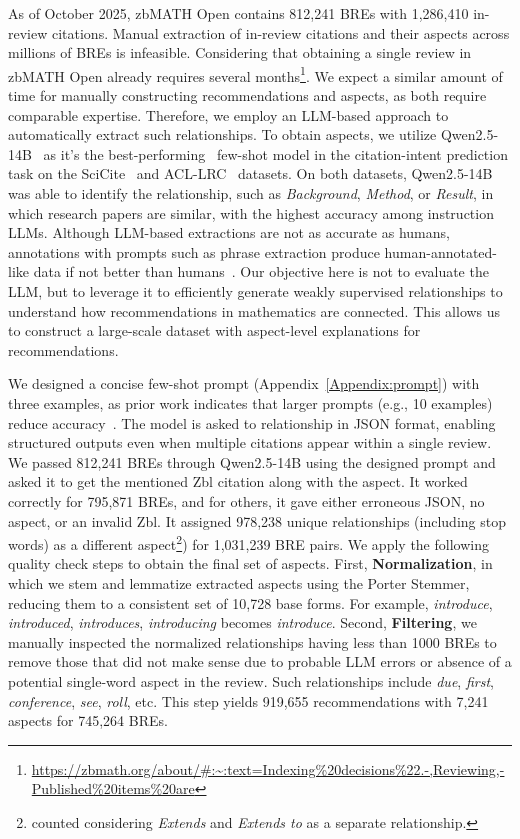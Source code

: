 \documentclass[sigconf,anonymous]{acmart}
\begin{document}
As of October 2025, zbMATH Open contains 812,241 BREs with 1,286,410 in-review citations.
Manual extraction of in-review citations and their aspects across millions of BREs is infeasible.
Considering that obtaining a single review in zbMATH Open already requires several months\footnote{\url{https://zbmath.org/about/\#:~:text=Indexing\%20decisions\%22.-,Reviewing,-Published\%20items\%20are}}.
We expect a similar amount of time for manually constructing recommendations and aspects, as both require comparable expertise.
Therefore, we employ an LLM-based approach to automatically extract such relationships.
To obtain aspects, we utilize Qwen2.5-14B~\cite{qwen2025qwen25technicalreport} as it's the best-performing~\cite{koloveas2025can} few-shot model in the citation-intent prediction task on the SciCite~\cite{cohan2019structural} and ACL-LRC~\cite{Jurgens2018ACLARC} datasets.
On both datasets, Qwen2.5-14B was able to identify the relationship, such as \textit{Background}, \textit{Method}, or \textit{Result}, in which research papers are similar, with the highest accuracy among instruction LLMs.
Although LLM-based extractions are not as accurate as humans, annotations with prompts such as phrase extraction produce human-annotated-like data if not better than humans~\cite{horych-etal-2025-promises,tan-etal-2024-large}.
Our objective here is not to evaluate the LLM, but to leverage it to efficiently generate weakly supervised relationships to understand how recommendations in mathematics are connected.
This allows us to construct a large-scale dataset with aspect-level explanations for recommendations.

We designed a concise few-shot prompt (Appendix~\ref{Appendix:prompt}) with three examples, as prior work indicates that larger prompts (e.g., 10 examples) reduce accuracy~\cite{koloveas2025can}. 
The model is asked to relationship in JSON format, enabling structured outputs even when multiple citations appear within a single review.
We passed 812,241 BREs through Qwen2.5-14B using the designed prompt and asked it to get the mentioned Zbl citation along with the aspect.
It worked correctly for 795,871 BREs, and for others, it gave either erroneous JSON, no aspect, or an invalid Zbl.  
It assigned 978,238 unique relationships (including stop words) as a different aspect\footnote{counted considering \textit{Extends} and \textit{Extends to} as a separate relationship.}) for 1,031,239 BRE pairs.
We apply the following quality check steps to obtain the final set of aspects.
First, \textbf{Normalization}, in which we stem and lemmatize extracted aspects using the Porter Stemmer, reducing them to a consistent set of 10,728 base forms.
For example, \textit{introduce}, \textit{introduced}, \textit{introduces}, \textit{introducing} becomes \textit{introduce}.
Second, \textbf{Filtering}, we manually inspected the normalized relationships having less than 1000 BREs to remove those that did not make sense due to probable LLM errors or absence of a potential single-word aspect in the review. 
Such relationships include \textit{due}, \textit{first}, \textit{conference}, \textit{see}, \textit{roll}, etc. 
This step yields 919,655 recommendations with 7,241 aspects for 745,264 BREs.
\end{document}
